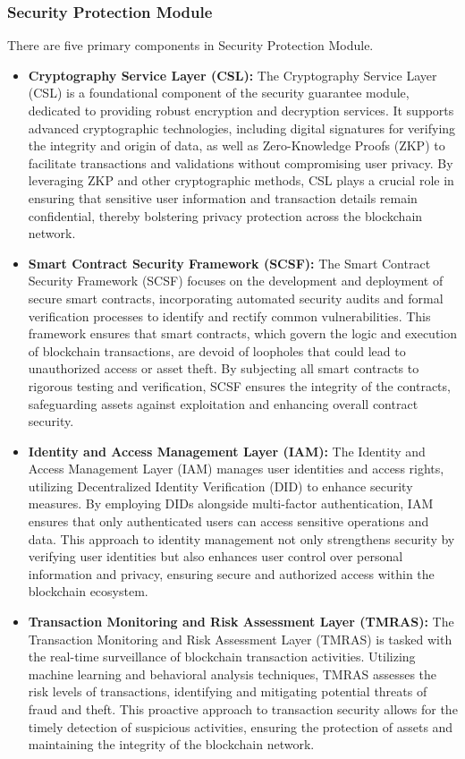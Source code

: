 \subsubsection{Security Protection Module}
There are five primary components in Security Protection Module. 
\begin{itemize}
    \item \textbf{Cryptography Service Layer (CSL):} The Cryptography Service Layer (CSL) is a foundational component of the security guarantee module, dedicated to providing robust encryption and decryption services. It supports advanced cryptographic technologies, including digital signatures for verifying the integrity and origin of data, as well as Zero-Knowledge Proofs (ZKP) to facilitate transactions and validations without compromising user privacy. By leveraging ZKP and other cryptographic methods, CSL plays a crucial role in ensuring that sensitive user information and transaction details remain confidential, thereby bolstering privacy protection across the blockchain network.
 \item \textbf{Smart Contract Security Framework (SCSF):} The Smart Contract Security Framework (SCSF) focuses on the development and deployment of secure smart contracts, incorporating automated security audits and formal verification processes to identify and rectify common vulnerabilities. This framework ensures that smart contracts, which govern the logic and execution of blockchain transactions, are devoid of loopholes that could lead to unauthorized access or asset theft. By subjecting all smart contracts to rigorous testing and verification, SCSF ensures the integrity of the contracts, safeguarding assets against exploitation and enhancing overall contract security.
 \item \textbf{Identity and Access Management Layer (IAM):} The Identity and Access Management Layer (IAM) manages user identities and access rights, utilizing Decentralized Identity Verification (DID) to enhance security measures. By employing DIDs alongside multi-factor authentication, IAM ensures that only authenticated users can access sensitive operations and data. This approach to identity management not only strengthens security by verifying user identities but also enhances user control over personal information and privacy, ensuring secure and authorized access within the blockchain ecosystem.
 \item \textbf{Transaction Monitoring and Risk Assessment Layer (TMRAS):} The Transaction Monitoring and Risk Assessment Layer (TMRAS) is tasked with the real-time surveillance of blockchain transaction activities. Utilizing machine learning and behavioral analysis techniques, TMRAS assesses the risk levels of transactions, identifying and mitigating potential threats of fraud and theft. This proactive approach to transaction security allows for the timely detection of suspicious activities, ensuring the protection of assets and maintaining the integrity of the blockchain network.

\end{itemize}
